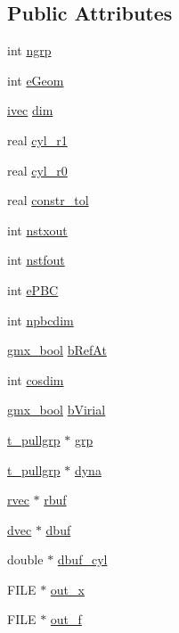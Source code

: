 \subsection*{\-Public \-Attributes}
\begin{DoxyCompactItemize}
\item 
int \hyperlink{structt__pull_aa00ee26866532039a965987a445326fd}{ngrp}
\item 
int \hyperlink{structt__pull_a04990c8bf3f21074d977dbe144705b04}{e\-Geom}
\item 
\hyperlink{share_2template_2gromacs_2types_2simple_8h_a74f6ffdb4a9c1764f5293969d8c681b6}{ivec} \hyperlink{structt__pull_a3bea8c915fb96dd32ae4708ae4e24353}{dim}
\item 
real \hyperlink{structt__pull_a2de2119542a9f0587ee8e75abd8917d1}{cyl\-\_\-r1}
\item 
real \hyperlink{structt__pull_a842c5a9c122239c4d86f769d3b281aa6}{cyl\-\_\-r0}
\item 
real \hyperlink{structt__pull_a362b4558908b00c8e7140ec62c508c6d}{constr\-\_\-tol}
\item 
int \hyperlink{structt__pull_a905f7b2badc79d473b72bbaafa65ba9a}{nstxout}
\item 
int \hyperlink{structt__pull_a9e0eadd8d92f989a806d35fe671cf76d}{nstfout}
\item 
int \hyperlink{structt__pull_a4bc2fecd997893be08d9cd059d536752}{e\-P\-B\-C}
\item 
int \hyperlink{structt__pull_a6e340dddc99d49aa8cf6daefc348307e}{npbcdim}
\item 
\hyperlink{include_2types_2simple_8h_a8fddad319f226e856400d190198d5151}{gmx\-\_\-bool} \hyperlink{structt__pull_acaaf0051a32c6ce15716d1479cce3ff0}{b\-Ref\-At}
\item 
int \hyperlink{structt__pull_adf9f59241b23f5612a8145c88c59c9eb}{cosdim}
\item 
\hyperlink{include_2types_2simple_8h_a8fddad319f226e856400d190198d5151}{gmx\-\_\-bool} \hyperlink{structt__pull_aa3ec8100ab67ac5940297010877fe8e7}{b\-Virial}
\item 
\hyperlink{structt__pullgrp}{t\-\_\-pullgrp} $\ast$ \hyperlink{structt__pull_a856d232ff0cfe02ff3cc19a9e85cbbe9}{grp}
\item 
\hyperlink{structt__pullgrp}{t\-\_\-pullgrp} $\ast$ \hyperlink{structt__pull_a50b7c41479e5ae0aa1799e982f4f24b8}{dyna}
\item 
\hyperlink{share_2template_2gromacs_2types_2simple_8h_aa02a552a4abd2f180c282a083dc3a999}{rvec} $\ast$ \hyperlink{structt__pull_acb4abc6f72fc42a2b1e35175cb2d3394}{rbuf}
\item 
\hyperlink{share_2template_2gromacs_2types_2simple_8h_ac3f526097e99b43b9962d8676756017d}{dvec} $\ast$ \hyperlink{structt__pull_abd4fc024c9cea91e6c069e311cf794e8}{dbuf}
\item 
double $\ast$ \hyperlink{structt__pull_acfa20a71f628a8107b5a26178d7a2e0f}{dbuf\-\_\-cyl}
\item 
\-F\-I\-L\-E $\ast$ \hyperlink{structt__pull_a8a09dae121a8fc67b2e9b28650807d30}{out\-\_\-x}
\item 
\-F\-I\-L\-E $\ast$ \hyperlink{structt__pull_a99c3fc4ebb485915a42270034e20b2da}{out\-\_\-f}
\end{DoxyCompactItemize}


